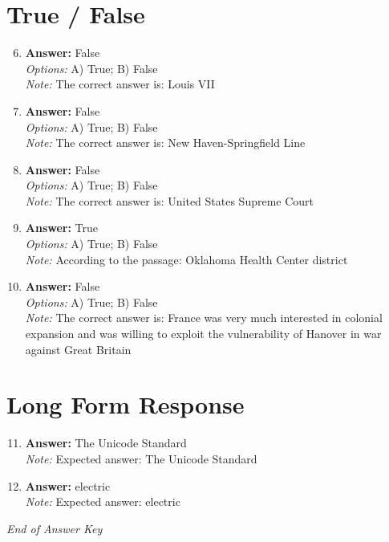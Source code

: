 \documentclass[12pt]{article}
\begin{document}
\section*{True / False}
\begin{enumerate}[label=\arabic*.]
\setcounter{enumi}{5}
\item \textbf{Answer:} False
\\ \textit{Options:} A) True; B) False
\\ \textit{Note:} The correct answer is: Louis VII
\item \textbf{Answer:} False
\\ \textit{Options:} A) True; B) False
\\ \textit{Note:} The correct answer is: New Haven-Springfield Line
\item \textbf{Answer:} False
\\ \textit{Options:} A) True; B) False
\\ \textit{Note:} The correct answer is: United States Supreme Court
\item \textbf{Answer:} True
\\ \textit{Options:} A) True; B) False
\\ \textit{Note:} According to the passage: Oklahoma Health Center district
\item \textbf{Answer:} False
\\ \textit{Options:} A) True; B) False
\\ \textit{Note:} The correct answer is: France was very much interested in colonial expansion and was willing to exploit the vulnerability of Hanover in war against Great Britain
\end{enumerate}

\section*{Long Form Response}
\begin{enumerate}[label=\arabic*.]
\setcounter{enumi}{10}
\item \textbf{Answer:} The Unicode Standard
\\ \textit{Note:} Expected answer: The Unicode Standard
\item \textbf{Answer:} electric
\\ \textit{Note:} Expected answer: electric
\end{enumerate}

\vfill
\noindent\textit{End of Answer Key}
\end{document}
